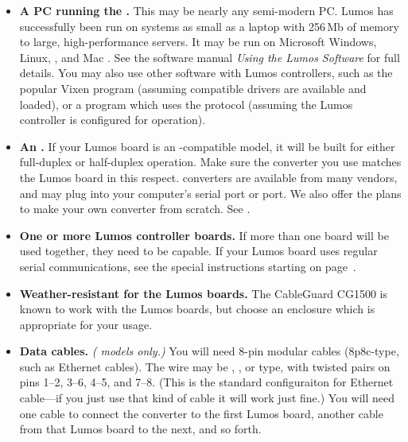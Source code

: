 \documentclass[letterpaper,twoside,onecolumn,openright,final]{memoir}
\begin{document}
\begin{itemize}
	\item	{\bfseries A PC running the .}
		This may be nearly any semi-modern PC.  Lumos has successfully been run on systems as small as 
		a laptop with 256\,Mb of memory to large, high-performance servers.  It may be run on Microsoft
		Windows, Linux, , and Mac .  See the software manual \emph{Using the Lumos Software} 
		for full details.  You may also use other software with Lumos controllers, such as the popular
		Vixen program (assuming compatible drivers are available and loaded), or a program which uses the
		 protocol (assuming the Lumos controller is configured for  operation).
		
	\item	{\bfseries An .}
		If your Lumos board is an -compatible model, it will be built for either full-duplex or half-duplex
		operation.  Make sure the  converter you use matches the Lumos board in this respect.  
		converters are available from many vendors, and may plug into your computer's serial port or 
		port.  We also offer the plans to make your own  converter from scratch.
		See .

	\item	{\bfseries One or more Lumos controller boards.}  If more than one board will be used together,
		they need to be  capable.  If your Lumos board uses regular  serial communications,
		see the special instructions starting on page~\pageref{sec:rs232}.

	\item	{\bfseries Weather-resistant  for the Lumos boards.}  The Cable\-Guard\textsuperscript{\textregistered}
		CG1500 
		is known to work with the Lumos boards, but choose an enclosure which is appropriate for your usage.

	\item	{\bfseries Data cables.}  \emph{( models only.)}
		You will need 8-pin modular cables (8p8c-type, such as Ethernet cables).  The 
		wire may be , , or  type, 
		with twisted pairs on pins 1--2, 3--6, 4--5, and 7--8.
		(This is the standard configuraiton for Ethernet cable---if you just use that kind of cable
		it will work just fine.)  You will need one cable to connect the  converter to the
		first Lumos board, another cable from that Lumos board to the next, and so forth.  


\end{itemize}
\end{document}
